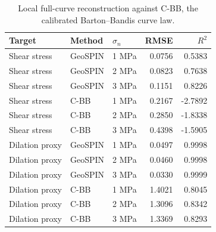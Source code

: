 \begin{table}
\caption{Local full-curve reconstruction against C-BB, the calibrated Barton--Bandis curve law.}
\label{tab:curve_reconstruction}
\begin{tabular}{lllrr}
\toprule
Target & Method & $\sigma_n$ & RMSE & $R^2$ \\
\midrule
Shear stress & GeoSPIN & 1 MPa & 0.0756 & 0.5383 \\
Shear stress & GeoSPIN & 2 MPa & 0.0823 & 0.7638 \\
Shear stress & GeoSPIN & 3 MPa & 0.1151 & 0.8226 \\
Shear stress & C-BB & 1 MPa & 0.2167 & -2.7892 \\
Shear stress & C-BB & 2 MPa & 0.2850 & -1.8338 \\
Shear stress & C-BB & 3 MPa & 0.4398 & -1.5905 \\
Dilation proxy & GeoSPIN & 1 MPa & 0.0497 & 0.9998 \\
Dilation proxy & GeoSPIN & 2 MPa & 0.0460 & 0.9998 \\
Dilation proxy & GeoSPIN & 3 MPa & 0.0330 & 0.9999 \\
Dilation proxy & C-BB & 1 MPa & 1.4021 & 0.8045 \\
Dilation proxy & C-BB & 2 MPa & 1.3096 & 0.8342 \\
Dilation proxy & C-BB & 3 MPa & 1.3369 & 0.8293 \\
\bottomrule
\end{tabular}
\end{table}
